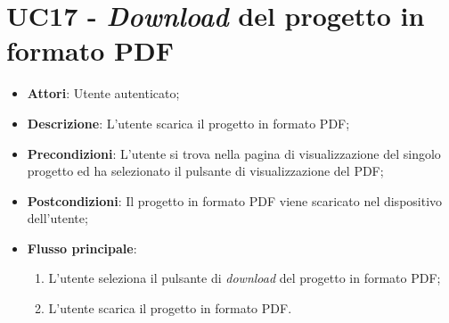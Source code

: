 \vspace{0.5cm}  
\section*{UC17 - \textit{Download} del progetto in formato PDF}
\begin{itemize}
    \item \textbf{Attori}: Utente autenticato;
    \item \textbf{Descrizione}: L'utente scarica il progetto in formato PDF;
    \item \textbf{Precondizioni}: L’utente si trova nella pagina di visualizzazione del singolo progetto ed ha selezionato il pulsante di visualizzazione del PDF;
    \item \textbf{Postcondizioni}: Il progetto in formato PDF viene scaricato nel dispositivo dell'utente;
    \item \textbf{Flusso principale}:
    \begin{enumerate}
        \item L’utente seleziona il pulsante di \textit{download} del progetto in formato PDF;
        \item L'utente scarica il progetto in formato PDF.
    \end{enumerate}
\end{itemize}

\vspace{0.5cm}  
